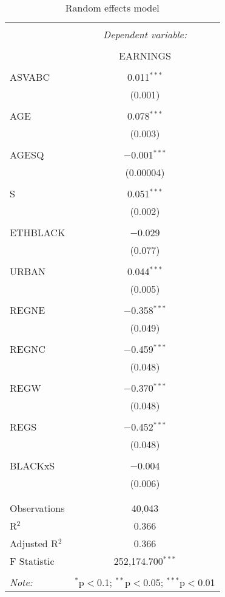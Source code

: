 \documentclass[
]{article}
\begin{document}
\begin{table}[!htbp] \centering 
  \caption{Random effects model} 
  \label{} 
\begin{tabular}{@{\extracolsep{5pt}}lc} 
\\[-1.8ex]\hline 
\hline \\[-1.8ex] 
 & \multicolumn{1}{c}{\textit{Dependent variable:}} \\ 
\cline{2-2} 
\\[-1.8ex] & EARNINGS \\ 
\hline \\[-1.8ex] 
 ASVABC & 0.011$^{***}$ \\ 
  & (0.001) \\ 
  & \\ 
 AGE & 0.078$^{***}$ \\ 
  & (0.003) \\ 
  & \\ 
 AGESQ & $-$0.001$^{***}$ \\ 
  & (0.00004) \\ 
  & \\ 
 S & 0.051$^{***}$ \\ 
  & (0.002) \\ 
  & \\ 
 ETHBLACK & $-$0.029 \\ 
  & (0.077) \\ 
  & \\ 
 URBAN & 0.044$^{***}$ \\ 
  & (0.005) \\ 
  & \\ 
 REGNE & $-$0.358$^{***}$ \\ 
  & (0.049) \\ 
  & \\ 
 REGNC & $-$0.459$^{***}$ \\ 
  & (0.048) \\ 
  & \\ 
 REGW & $-$0.370$^{***}$ \\ 
  & (0.048) \\ 
  & \\ 
 REGS & $-$0.452$^{***}$ \\ 
  & (0.048) \\ 
  & \\ 
 BLACKxS & $-$0.004 \\ 
  & (0.006) \\ 
  & \\ 
\hline \\[-1.8ex] 
Observations & 40,043 \\ 
R$^{2}$ & 0.366 \\ 
Adjusted R$^{2}$ & 0.366 \\ 
F Statistic & 252,174.700$^{***}$ \\ 
\hline 
\hline \\[-1.8ex] 
\textit{Note:}  & \multicolumn{1}{r}{$^{*}$p$<$0.1; $^{**}$p$<$0.05; $^{***}$p$<$0.01} \\ 
\end{tabular} 
\end{table}
\end{document}
